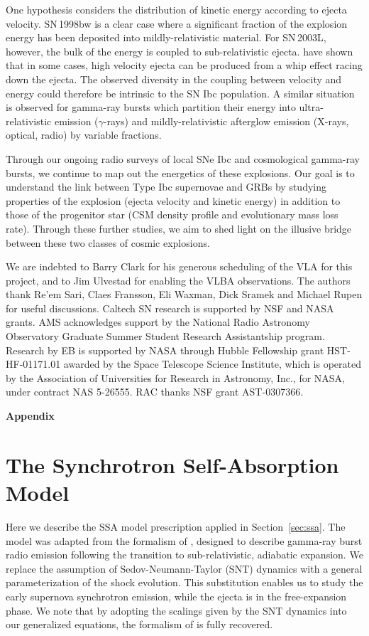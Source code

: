 \documentclass[12pt,preprint]{aastex}
\begin{document}
One hypothesis considers the distribution of kinetic energy according
to ejecta velocity.  SN\,1998bw is a clear case where a significant
fraction of the explosion energy has been deposited into
mildly-relativistic material.  For SN\,2003L, however, the bulk of the
energy is coupled to sub-relativistic ejecta.  \citet{tmm01} have
shown that in some cases, high velocity ejecta can be produced from
a whip effect racing down the ejecta.  The observed diversity in
the coupling between velocity and energy could therefore be intrinsic
to the SN Ibc population. A similar situation is observed for
gamma-ray bursts which partition their energy into ultra-relativistic
emission ($\gamma$-rays) and mildly-relativistic afterglow emission
(X-rays, optical, radio) by variable fractions.

Through our ongoing radio surveys of local SNe Ibc and cosmological
gamma-ray bursts, we continue to map out the energetics of these
explosions.  Our goal is to understand the link between Type Ibc
supernovae and GRBs by studying properties of the explosion (ejecta
velocity and kinetic energy) in addition to those of the progenitor
star (CSM density profile and evolutionary mass loss rate).  Through
these further studies, we aim to shed light on the illusive bridge
between these two classes of cosmic explosions.

\acknowledgments We are indebted to Barry Clark for his generous
scheduling of the VLA for this project, and to Jim Ulvestad for 
enabling the VLBA observations. The authors thank Re'em Sari,
Claes Fransson, Eli Waxman, Dick Sramek and Michael Rupen for useful
discussions.  Caltech SN research is supported by NSF and NASA
grants.  AMS acknowledges support by the National Radio Astronomy
Observatory Graduate Summer Student Research Assistantship program.
Research by EB is supported by NASA through Hubble Fellowship grant
HST-HF-01171.01 awarded by the Space Telescope Science Institute,
which is operated by the Association of Universities for Research in
Astronomy, Inc., for NASA, under contract NAS 5-26555.  RAC thanks NSF
grant AST-0307366.



\clearpage

\appendix

\centerline{\large \bf Appendix \rm \normalsize}

\section{The Synchrotron Self-Absorption Model}
Here we describe the SSA model prescription applied in
Section~\ref{sec:ssa}.  The model was adapted from the formalism of
\citep{fwk00}, designed to describe gamma-ray burst radio emission
following the transition to sub-relativistic, adiabatic expansion.  We
replace the assumption of Sedov-Neumann-Taylor (SNT) dynamics
\citep{zr02} with a general parameterization of the shock evolution.
This substitution enables us to study the early supernova synchrotron
emission, while the ejecta is in the free-expansion phase.  We note
that by adopting the scalings given by the SNT dynamics into our
generalized equations, the formalism of \citet{fwk00} is fully
recovered.
\end{document}
